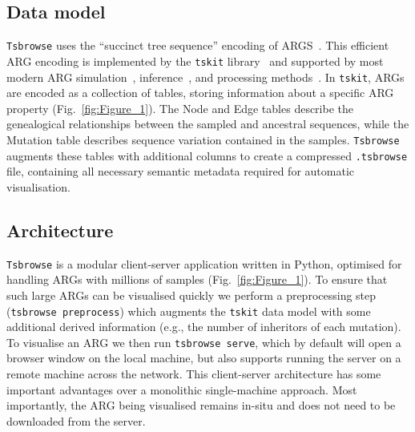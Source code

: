 \documentclass[unnumsec,webpdf,contemporary,large,namedate]{oup-authoring-template}%
\begin{document}
\subsection{Data model} \label{subsec:Data_Model} 
\texttt{Tsbrowse} uses the ``succinct tree sequence'' encoding of 
ARGS~\citep{wong2024general}. This efficient ARG encoding 
is implemented by the 
\texttt{tskit} library~\citep{ralph2020efficiently}
and supported by most modern ARG
simulation~\citep{kelleher2016efficient,kelleher2018efficient,
haller2019tree,baumdicker2022efficient,
adrion2020community,lauterbur2023expanding,korfmann2023weak,
tsambos2023link,tagami2024tstrait},
inference~\citep{kelleher2019inferring,speidel2019method,wohns2022unified,
mahmoudi2022bayesian,zhan2023towards,zhang2023biobank,deng2025general},
and processing methods~\citep{fan2022genealogical,nowbandegani2023extremely}.
In \texttt{tskit}, ARGs are encoded as a
collection of tables, storing information about a specific ARG
property (Fig.~\ref{fig:Figure_1}).
The Node and Edge tables describe the genealogical relationships
between the sampled and ancestral sequences, 
while the Mutation table describes
sequence variation contained in the samples. 
\texttt{Tsbrowse} augments these tables with additional columns to create
a compressed \texttt{.tsbrowse} file, containing all necessary semantic
metadata required for automatic visualisation.

\subsection{Architecture} 
\texttt{Tsbrowse} is a modular client-server application 
written in Python, optimised for handling ARGs with millions
of samples (Fig.~\ref{fig:Figure_1}). 
To ensure that such large ARGs can be visualised quickly
we perform a preprocessing step (\texttt{tsbrowse preprocess})
which augments the \texttt{tskit} 
data model with some additional derived information (e.g., the number 
of inheritors of each mutation).
To visualise an ARG we then run \texttt{tsbrowse serve}, which 
by default will open a browser window on the local machine, but 
also supports running the server on a remote machine across the 
network.
This client-server architecture has some important advantages over
a monolithic single-machine approach. Most importantly,
the ARG being visualised remains in-situ and does not need to be 
downloaded from the server. 
\end{document}
